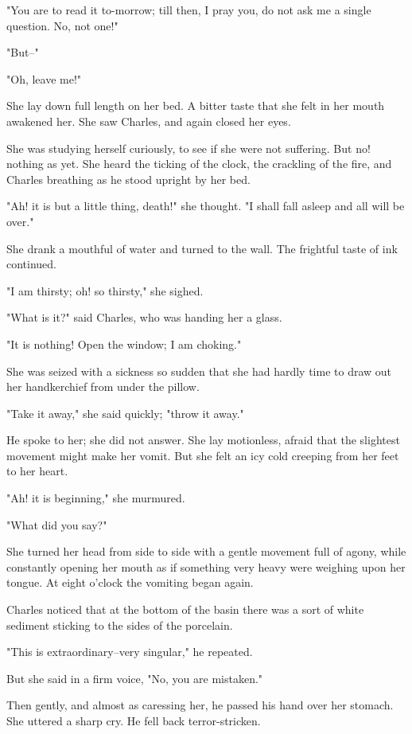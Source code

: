 \documentclass[11pt,twocolumn]{ltugboat}
\begin{document}
"You are to read it to-morrow; till then, I pray you, do not ask me a
single question. No, not one!"

"But--"

"Oh, leave me!"

She lay down full length on her bed. A bitter taste that she felt in her
mouth awakened her. She saw Charles, and again closed her eyes.

She was studying herself curiously, to see if she were not suffering.
But no! nothing as yet. She heard the ticking of the clock, the
crackling of the fire, and Charles breathing as he stood upright by her
bed.

"Ah! it is but a little thing, death!" she thought. "I shall fall asleep
and all will be over."

She drank a mouthful of water and turned to the wall. The frightful
taste of ink continued.

"I am thirsty; oh! so thirsty," she sighed.

"What is it?" said Charles, who was handing her a glass.

"It is nothing! Open the window; I am choking."

She was seized with a sickness so sudden that she had hardly time to
draw out her handkerchief from under the pillow.

"Take it away," she said quickly; "throw it away."

He spoke to her; she did not answer. She lay motionless, afraid that
the slightest movement might make her vomit. But she felt an icy cold
creeping from her feet to her heart.

"Ah! it is beginning," she murmured.

"What did you say?"

She turned her head from side to side with a gentle movement full of
agony, while constantly opening her mouth as if something very heavy
were weighing upon her tongue. At eight o'clock the vomiting began
again.

Charles noticed that at the bottom of the basin there was a sort of
white sediment sticking to the sides of the porcelain.

"This is extraordinary--very singular," he repeated.

But she said in a firm voice, "No, you are mistaken."

Then gently, and almost as caressing her, he passed his hand over her
stomach. She uttered a sharp cry. He fell back terror-stricken.
\end{document}
